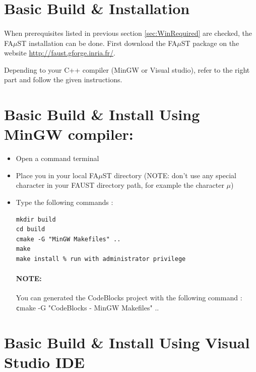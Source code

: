 




\section{Basic Build \& Installation}\label{sec:WinBasicInstall}
\paragraph{}When prerequisites listed in previous section \ref{sec:WinRequired} are checked, the FA$\mu$ST installation can be done. 
First download the FA$\mu$ST package on the website  \url{http://faust.gforge.inria.fr/}. 

Depending to your C++ compiler (MinGW or Visual studio), refer to the right part and follow the given instructions.
\\

\section{Basic Build \& Install Using MinGW compiler:}
\label{sec:WinMinGWBasicInstall}

\begin{itemize}
\item Open a command terminal
\item Place you in your local FA$\mu$ST directory (NOTE: don't use any special character in your FAUST directory path, for example the character $\mu$)
\item Type the following commands : 

\begin{lstlisting}
mkdir build
cd build
cmake -G "MinGW Makefiles" .. 
make
make install % run with administrator privilege
\end{lstlisting}
\paragraph{NOTE:} You can generated the CodeBlocks project with the following command : \\
\texttt cmake -G "CodeBlocks - MinGW Makefiles" .. 

\end{itemize}

\section{Basic Build \& Install Using Visual Studio IDE}\label{sec:WinVisualStudioBasicInstall}
